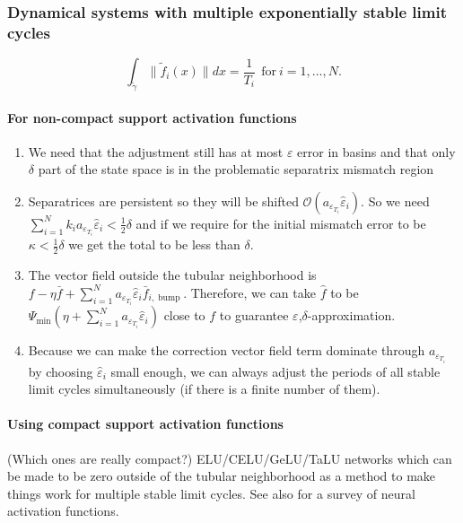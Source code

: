 \documentclass{article}
\newcommand{\ascomment}[1]{\textcolor{ascolor}{(#1)}}
\newcounter{ct}
\begin{document}
\subsubsection{Dynamical systems with multiple exponentially stable limit cycles}\label{sec:mlc_extras}
\begin{equation}\label{eq:nlc_constraints}
\int_{\tilde{\gamma}}\|\tilde{f}_i(x)\| dx = \frac{1}{T_i} \ \  \text{for} \ i=1,\dots, N. 	%
\end{equation}


\paragraph{For non-compact support activation functions}
\begin{enumerate}
\item We need that the adjustment still has at most $\varepsilon$ error in basins and that only $\delta$ part of the state space is in the problematic separatrix mismatch region
\item Separatrices are persistent so they will be shifted $\mathcal{O}(a_{\varepsilon_{T_i}}\hat \varepsilon_i)$. So we need $\sum_{i=1}^{N}k_i a_{\varepsilon_{T_i}}\hat \varepsilon_i < \tfrac{1}{2}\delta$ and if we require for the initial mismatch error to be $\kappa<\tfrac{1}{2}\delta$ we get the total to be less than $\delta$. 
\item The vector field outside the tubular neighborhood is $f - \eta\bar f  + \sum_{i=1}^Na_{\varepsilon_{T_i}}\hat \varepsilon_i\bar f_{i,\operatorname{bump}}$. 
Therefore, we can take $\hat f$ to be  $\Psi_{\min}(\eta + \sum_{i=1}^Na_{\varepsilon_{T_i}}\hat \varepsilon_i)$ close to $f$ to guarantee $\varepsilon$,$\delta$-approximation.
\item Because we can make the correction vector field term dominate through $a_{\varepsilon_{T_i}}$ by choosing $\hat \varepsilon_i$ small enough, we can always adjust the periods of all stable limit cycles simultaneously (if there is a finite number of them).
\end{enumerate}

\paragraph{Using compact support activation functions}
\ascomment{Which ones are really compact?}
 ELU/CELU/GeLU/TaLU networks \citep{clevert2015elu,barron2017celu,elfwing2018sigmoid,hasan2023talu} which can be made to be zero outside of the tubular neighborhood as a method to make things work for multiple stable limit cycles.
See also  \citep{duch1999survey,dubey2022activation,jagtap2023activation,ramachandran2017activation,hayou2019activation} for a survey of neural activation functions.
\end{document}
